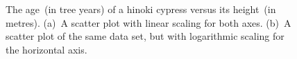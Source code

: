 \documentclass[a4paper,oneside,12pt]{article}
\begin{document}
\begin{figure}[!htbp]
\centering
{}
\caption{%
  The age~(in tree years) of a hinoki cypress versus its height~(in
  metres).  (a)~A scatter plot with linear scaling for both axes.
  (b)~A scatter plot of the same data set, but with logarithmic
  scaling for the horizontal axis.
}
\label{fig:logarithm:hinoki_cypress}
\end{figure}
\end{document}
